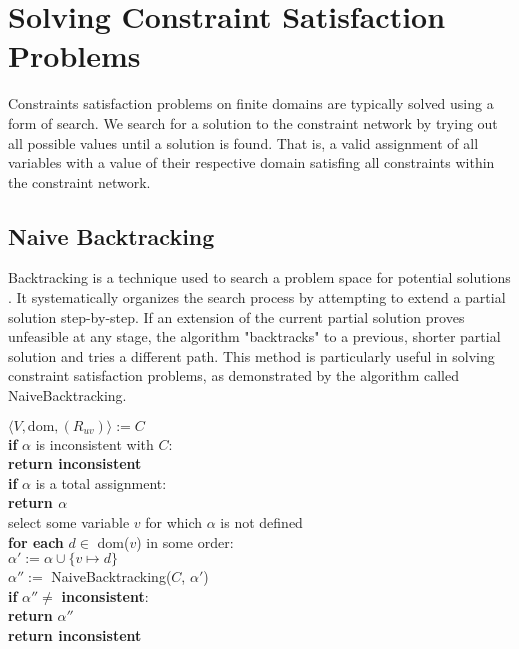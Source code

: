 \chapter{Solving Constraint Satisfaction Problems}

Constraints satisfaction problems on finite domains are typically solved using a form of search. We search for a solution to the constraint network by trying out all possible values until a solution is found. That is, a valid assignment of all variables with a value of their respective domain satisfing all constraints within the constraint network.

\section{Naive Backtracking}

Backtracking is a technique used to search a problem space for potential solutions \cite{backtracking:1975}. It systematically organizes the search process by attempting to extend a partial solution step-by-step. If an extension of the current partial solution proves unfeasible at any stage, the algorithm "backtracks" to a previous, shorter partial solution and tries a different path. This method is particularly useful in solving constraint satisfaction problems, as demonstrated by the algorithm called NaiveBacktracking.

\begin{tcolorbox}[title=function NaiveBacktracking)]
	$\langle V, \text{dom}, (R_{uv})\rangle := C$ \\
	\textbf{if} $\alpha$ is inconsistent with $C$: \\
	\textbf{return inconsistent} \\

	\textbf{if} $\alpha$ is a total assignment: \\
	\textbf{return $\alpha$} \\

	select some variable $v$ for which $\alpha$ is not defined \\
	\textbf{for each} $d \in$ dom($v$) in some order: \\
	$\alpha' := \alpha \cup \{v \mapsto d\}$ \\
	$\alpha'' := $ NaiveBacktracking($C$, $\alpha'$) \\
	\textbf{if} $\alpha'' \neq$ \textbf{inconsistent}: \\
	\textbf{return} $\alpha''$ \\

	\textbf{return inconsistent}
\end{tcolorbox}

